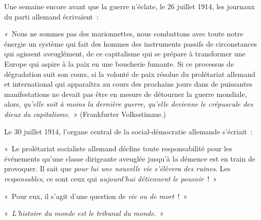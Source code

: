 \documentclass[french,twoside]{book} %
\newenvironment{quoteblock}%
  {\begin{quoting}}
  {\end{quoting}}
\newenvironment{quotebar}{%
    \def\FrameCommand{{\color{rubric!10!}\vrule width 0.5em} \hspace{0.9em}}%
    \def\OuterFrameSep{\itemsep} %
    \MakeFramed {\advance\hsize-\width \FrameRestore}
  }%
  {%
    \endMakeFramed
  }
\renewenvironment{quoteblock}%
  {%
    \savenotes
    \setstretch{0.9}
    \normalfont
    \begin{quotebar}
  }
  {%
    \end{quotebar}
    \spewnotes
  }
\begin{document}
\noindent Une semaine encore avant que la guerre n’éclate, le 26 juillet 1914, les journaux du parti allemand écrivaient :\par

\begin{quoteblock}
 \noindent « Nous ne sommes pas des marionnettes, nous combattons avec toute notre énergie un système qui fait des hommes des instruments passifs de circonstances qui agissent aveuglément, de ce capitalisme qui se prépare à transformer une Europe qui aspire à la paix en une boucherie fumante. Si ce processus de dégradation suit son cours, si la volonté de paix résolue du prolétariat allemand et international qui apparaîtra au cours des prochains jours dans de puissantes manifestations ne devait pas être en mesure de détourner la guerre mondiale, alors, \emph{qu’elle soit à moins la dernière guerre, qu’elle devienne le crépuscule des dieux du capitalisme}. » (Frankfurter Volksstimme.)
\end{quoteblock}

\noindent Le 30 juillet 1914, l’organe central de la social-démocratie allemande s’écriait :\par

\begin{quoteblock}
 \noindent « Le prolétariat socialiste allemand décline toute responsabilité pour les événements qu’une classe dirigeante aveuglée jusqu’à la démence est en train de provoquer. Il sait que \emph{pour lui une nouvelle vie s’élèvera des ruines}. Les \emph{responsables}, ce sont ceux qui \emph{aujourd’hui détiennent le pouvoir} ! »\par
 « Pour eux, il s’agit d’une question de \emph{vie ou de mort} ! »\par
 « \emph{L'histoire du monde est le tribunal du monde.} »
\end{quoteblock}
\end{document}
